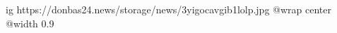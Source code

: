  
 
 
 
 

\ifcmt
  ig https://donbas24.news/storage/news/3yigocavgib1lolp.jpg
  @wrap center
  @width 0.9
\fi
